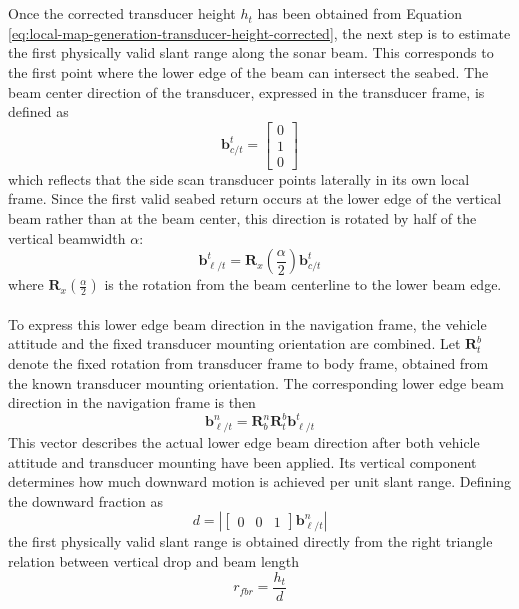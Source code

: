 \\ \\
Once the corrected transducer height $h_t$ has been obtained from Equation \ref{eq:local-map-generation-transducer-height-corrected}, the next step is to estimate the first physically valid slant range along the sonar beam. This corresponds to the first point where the lower edge of the beam can intersect the seabed. The beam center direction of the transducer, expressed in the transducer frame, is defined as
$$
    \mathbf{b}_{c/t}^t =
    \begin{bmatrix}
        0 \\ 1 \\ 0
    \end{bmatrix}
$$
which reflects that the side scan transducer points laterally in its own local frame. Since the first valid seabed return occurs at the lower edge of the vertical beam rather than at the beam center, this direction is rotated by half of the vertical beamwidth $\alpha$:
$$
    \mathbf{b}_{\ell/t}^t = \mathbf{R}_x\!\left(\frac{\alpha}{2}\right) \mathbf{b}_{c/t}^t
$$
where $\mathbf{R}_x\!\left(\frac{\alpha}{2}\right)$ is the rotation from the beam centerline to the lower beam edge. 
\\ \\
To express this lower edge beam direction in the navigation frame, the vehicle attitude and the fixed transducer mounting orientation are combined. Let $\mathbf{R}_{t}^{b}$ denote the fixed rotation from transducer frame to body frame, obtained from the known transducer mounting orientation. The corresponding lower edge beam direction in the navigation frame is then
$$
    \mathbf{b}_{\ell/t}^n = \mathbf{R}_{b}^{n}\mathbf{R}_{t}^{b}\mathbf{b}_{\ell/t}^t
$$
This vector describes the actual lower edge beam direction after both vehicle attitude and transducer mounting have been applied. Its vertical component determines how much downward motion is achieved per unit slant range. Defining the downward fraction as
$$
    d = \left| 
    \begin{bmatrix}
        0 & 0 & 1
    \end{bmatrix}
    \mathbf{b}_{\ell/t}^n
    \right|
    \label{eq:local-map-generation-down-component}
$$
the first physically valid slant range is obtained directly from the right triangle relation between vertical drop and beam length
\begin{equation}
    r_{fbr} = \frac{h_t}{d}
    \label{eq:local-map-generation-first-bottom-return}
\end{equation}
